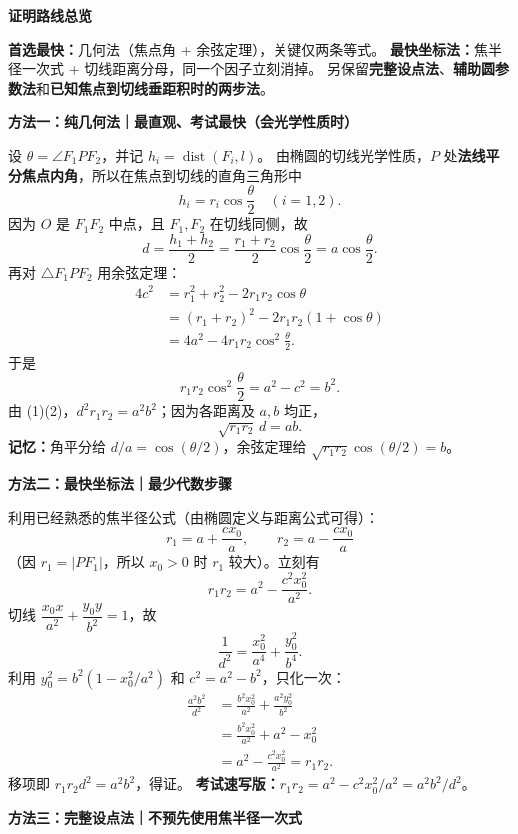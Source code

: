 \begin{proofbox}
\textbf{\textcolor{CProof}{证明路线总览}}

\textbf{首选最快：}几何法（焦点角 + 余弦定理），关键仅两条等式。
\textbf{最快坐标法：}焦半径一次式 + 切线距离分母，同一个因子立刻消掉。
另保留\textbf{完整设点法}、\textbf{辅助圆参数法}和\textbf{已知焦点到切线垂距积时的两步法}。

\medskip
\textbf{\textcolor{CProof}{方法一：纯几何法｜最直观、考试最快（会光学性质时）}}

设 $\theta=\angle F_1PF_2$，并记 $h_i=\operatorname{dist}(F_i,l)$。
由椭圆的切线光学性质，$P$ 处\textbf{法线平分焦点内角}，所以在焦点到切线的直角三角形中
\[
h_i=r_i\cos\frac{\theta}{2}\quad(i=1,2).
\]
因为 $O$ 是 $F_1F_2$ 中点，且 $F_1,F_2$ 在切线同侧，故
\[
\boxed{d=\frac{h_1+h_2}{2}
      =\frac{r_1+r_2}{2}\cos\frac{\theta}{2}
      =a\cos\frac{\theta}{2}}.\tag{1}
\]
再对 $\triangle F_1PF_2$ 用余弦定理：
\[
\begin{aligned}
4c^2
 &=r_1^2+r_2^2-2r_1r_2\cos\theta\\
 &=(r_1+r_2)^2-2r_1r_2(1+\cos\theta)\\
 &=4a^2-4r_1r_2\cos^2\frac{\theta}{2}.
\end{aligned}
\]
于是
\[
\boxed{r_1r_2\cos^2\frac{\theta}{2}=a^2-c^2=b^2}.\tag{2}
\]
由 (1)(2)，$d^2r_1r_2=a^2b^2$；因为各距离及 $a,b$ 均正，
\[
\boxed{\sqrt{r_1r_2}\,d=ab}.
\]
\textbf{记忆：}角平分给 $d/a=\cos(\theta/2)$，余弦定理给 $\sqrt{r_1r_2}\cos(\theta/2)=b$。

\medskip
\textbf{\textcolor{CProof}{方法二：最快坐标法｜最少代数步骤}}

利用已经熟悉的焦半径公式（由椭圆定义与距离公式可得）：
\[
\boxed{r_1=a+\frac{cx_0}{a}},\qquad
\boxed{r_2=a-\frac{cx_0}{a}}
\]
（因 $r_1=|PF_1|$，所以 $x_0>0$ 时 $r_1$ 较大）。立刻有
\[
\boxed{r_1r_2=a^2-\frac{c^2x_0^2}{a^2}}.\tag{3}
\]
切线 $\dfrac{x_0x}{a^2}+\dfrac{y_0y}{b^2}=1$，故
\[
\frac1{d^2}=\frac{x_0^2}{a^4}+\frac{y_0^2}{b^4}.
\]
利用 $y_0^2=b^2(1-x_0^2/a^2)$ 和 $c^2=a^2-b^2$，只化一次：
\[
\begin{aligned}
\frac{a^2b^2}{d^2}
 &=\frac{b^2x_0^2}{a^2}+\frac{a^2y_0^2}{b^2}\\
 &=\frac{b^2x_0^2}{a^2}+a^2-x_0^2\\
 &=a^2-\frac{c^2x_0^2}{a^2}
 =r_1r_2.
\end{aligned}
\]
移项即 $r_1r_2d^2=a^2b^2$，得证。
\textbf{考试速写版：}$r_1r_2=a^2-c^2x_0^2/a^2=a^2b^2/d^2$。

\medskip
\textbf{\textcolor{CProof}{方法三：完整设点法｜不预先使用焦半径一次式}}


\end{proofbox}
